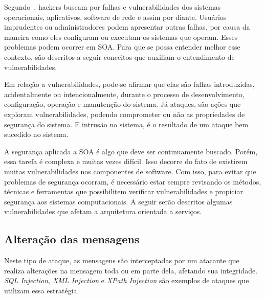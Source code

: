 Segundo~\cite{Verissimo2001}, hackers buscam por falhas e vulnerabilidades dos sistemas operacionais, aplicativos, software de rede e assim por diante. Usuários imprudentes ou administradores podem apresentar outras falhas, por causa da maneira como eles configuram ou executam os sistemas que operam. Esses problemas podem ocorrer em SOA. Para que se possa entender melhor esse contexto, são descritos a seguir conceitos que auxiliam o entendimento de vulnerabilidades.

Em relação a vulnerabilidades, pode-se afirmar que elas são falhas introduzidas, acidentalmente ou intencionalmente, durante o processo de desenvolvimento, configuração, operação e manutenção do sistema. Já ataques, são ações que exploram vulnerabilidades, podendo comprometer ou não as propriedades de segurança do sistema. E intrusão no sistema, é o resultado de um ataque bem sucedido no sistema.





A segurança aplicada a SOA é algo que deve ser continuamente buscado. Porém, essa tarefa é complexa e muitas vezes difícil. Isso decorre do fato de existirem muitas vulnerabilidades nos componentes de software. Com isso, para evitar que problemas de segurança ocorram, é necessário estar sempre revisando os métodos, técnicas e ferramentas que possibilitem verificar vulnerabilidades e propiciar segurança aos sistemas computacionais. A seguir serão descritos algumas vulnerabilidades que afetam a arquitetura orientada a serviços.

\subsection{Alteração das mensagens}

Neste tipo de ataque, as mensagens são interceptadas por um atacante que realiza alterações na mensagem toda ou em parte dela, afetando sua integridade. \emph{SQL Injection}, \emph{XML Injection} e \emph{XPath Injection} são exemplos de ataques que utilizam essa estratégia.

